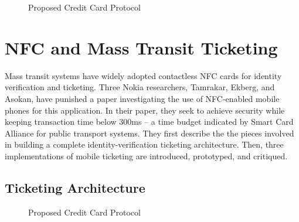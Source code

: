 \documentclass{sig-alternate}
\begin{document}

\begin{figure}
\centering
{}
\caption{Proposed Credit Card Protocol~\cite{CC2016}}
\label{fig:secureCC}
\end{figure}



\section{NFC and Mass Transit Ticketing}
\label{sec:mobile}

Mass transit systems have widely adopted contactless NFC cards for identity verification and ticketing. Three Nokia researchers, Tamrakar, Ekberg, and Asokan, have punished a paper investigating the use of NFC-enabled mobile phones for this application. In their paper, they seek to achieve security while keeping transaction time below 300ms -- a time budget indicated by Smart Card Alliance for public transport systems.
They first describe the the pieces involved in building a complete identity-verification ticketing architecture. Then, three implementations of mobile ticketing are introduced, prototyped, and critiqued.~\cite{Ticket2011}

\subsection{Ticketing Architecture}
\begin{figure}
\centering
{}
\caption{Proposed Credit Card Protocol~\cite{CC2016}}
\label{fig:ticketingArch}
\end{figure}
\end{document}
